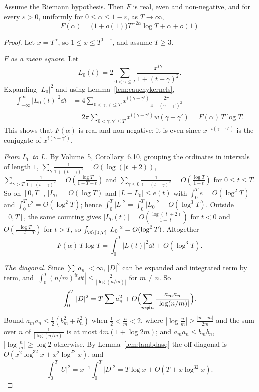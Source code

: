 \begin{theorem}[Montgomery, 1973]\label{thm:montgomerypc}
Assume the Riemann hypothesis. Then $F$ is real, even and non-negative, and for every $\varepsilon>0$, uniformly for $0\le\alpha\le1-\varepsilon$, as $T\to\infty$,
\[
F(\alpha)=\bigl(1+o(1)\bigr)T^{-2\alpha}\log T+\alpha+o(1)
\]
\end{theorem}
\begin{proof}
Let $x=T^\alpha$, so $1\le x\le T^{1-\varepsilon}$, and assume $T\ge3$.

\emph{$F$ as a mean square.} Let
\[
L_0(t)=2\sum_{0<\gamma\le T}\frac{x^{i\gamma}}{1+(t-\gamma)^2}.
\]
Expanding $|L_0|^2$ and using Lemma~\ref{lem:cauchykernels},
\[
\begin{aligned}\int_{-\infty}^\infty|L_0(t)|^2\dd t&=4\sum_{0<\gamma,\gamma'\le T}x^{i(\gamma-\gamma')}\frac{2\pi}{4+(\gamma-\gamma')^2}\\&=2\pi\sum_{0<\gamma,\gamma'\le T}x^{i(\gamma-\gamma')}w(\gamma-\gamma')=F(\alpha)\,T\log T.\end{aligned}
\]
This shows that $F(\alpha)$ is real and non-negative; it is even since $x^{-i(\gamma-\gamma')}$ is the conjugate of $x^{i(\gamma-\gamma')}$.

\emph{From $L_0$ to $L$.} By Volume~5, Corollary~6.10, grouping the ordinates in intervals of length $1$, $\sum_\gamma\frac1{1+(t-\gamma)^2}=O(\log(|t|+2))$, $\sum_{\gamma>T}\frac1{1+(t-\gamma)^2}=O(\frac{\log T}{1+T-t})$ and $\sum_{\gamma\le0}\frac1{1+(t-\gamma)^2}=O(\frac{\log T}{1+t})$ for $0\le t\le T$. So on $[0,T]$, $|L_0|=O(\log T)$ and $|L-L_0|\le e(t)$ with $\int_0^Te=O(\log^2T)$ and $\int_0^Te^2=O(\log^2T)$; hence $\int_0^T|L|^2=\int_0^T|L_0|^2+O(\log^3T)$. Outside $[0,T]$, the same counting gives $|L_0(t)|=O(\frac{\log(|t|+2)}{1+|t|})$ for $t<0$ and $O(\frac{\log T}{1+t-T})$ for $t>T$, so $\int_{\R\setminus[0,T]}|L_0|^2=O(\log^2T)$. Altogether
\[
F(\alpha)\,T\log T=\int_0^T|L(t)|^2\dd t+O(\log^3T).
\]

\emph{The diagonal.} Since $\sum|a_n|<\infty$, $|D|^2$ can be expanded and integrated term by term, and $|\int_0^T(n/m)^{it}\dd t|\le\frac2{|\log(n/m)|}$ for $m\ne n$. So
\[
\int_0^T|D|^2=T\sum a_n^2+O\Bigl(\sum_{m\ne n}\frac{a_ma_n}{|\log(n/m)|}\Bigr).
\]
Bound $a_ma_n\le\frac12(b_m^2+b_n^2)$ when $\frac12<\frac nm<2$, where $|\log\frac nm|\ge\frac{|n-m|}{2m}$ and the sum over $n$ of $\frac1{|\log(n/m)|}$ is at most $4m(1+\log2m)$; and $a_ma_n\le b_mb_n$, $|\log\frac nm|\ge\log2$ otherwise. By Lemma~\ref{lem:lambdasq} the off-diagonal is $O(x^2\log^32x+x^2\log^22x)$, and
\[
\int_0^T|U|^2=x^{-1}\int_0^T|D|^2=T\log x+O(T+x\log^32x).
\]


\end{proof}
